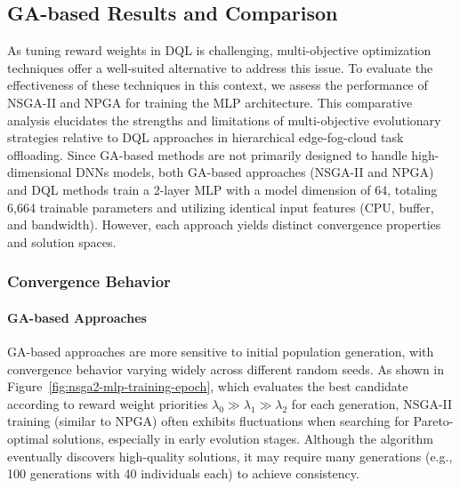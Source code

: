 \documentclass[preprint,3p,authoryear]{elsarticle}
\begin{document}

\subsection{GA-based Results and Comparison}\label{subsec:ga_vs_DQL}

As tuning reward weights in DQL is challenging, multi-objective optimization techniques offer a well-suited alternative to address this issue. To evaluate the effectiveness of these techniques in this context, we assess the performance of NSGA-II and NPGA for training the MLP architecture. This comparative analysis elucidates the strengths and limitations of multi-objective evolutionary strategies relative to DQL approaches in hierarchical edge-fog-cloud task offloading. Since GA-based methods are not primarily designed to handle high-dimensional DNNs models, both GA-based approaches (NSGA-II and NPGA) and DQL methods train a 2-layer MLP with a model dimension of 64, totaling 6,664 trainable parameters and utilizing identical input features (CPU, buffer, and bandwidth). However, each approach yields distinct convergence properties and solution spaces.

\subsubsection{Convergence Behavior}

\paragraph{GA-based Approaches}
GA-based approaches are more sensitive to initial population generation, with convergence behavior varying widely across different random seeds. As shown in Figure~\ref{fig:nsga2-mlp-training-epoch}, which evaluates the best candidate according to reward weight priorities \(\lambda_0 \gg \lambda_1 \gg \lambda_2\) for each generation, NSGA-II training (similar to NPGA) often exhibits fluctuations when searching for Pareto-optimal solutions, especially in early evolution stages. Although the algorithm eventually discovers high-quality solutions, it may require many generations (e.g., 100 generations with 40 individuals each) to achieve consistency.
\end{document}
